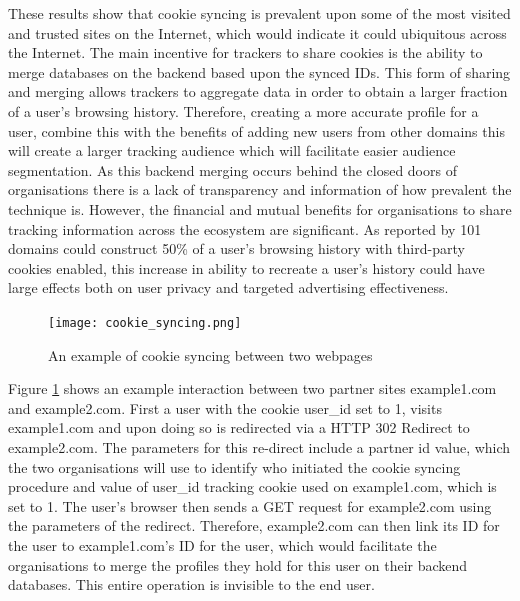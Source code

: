 \documentclass[12pt]{article}
\begin{document}
These results show that cookie syncing is prevalent upon some of the most visited and trusted sites on the Internet, which would indicate it could ubiquitous across the Internet. The main incentive for trackers to share cookies is the ability to merge databases on the backend based upon the synced IDs. This form of sharing and merging allows trackers to aggregate data in order to obtain a larger fraction of a user's browsing history. Therefore, creating a more accurate profile for a user, combine this with the benefits of adding new users from other domains this will create a larger tracking audience which will facilitate easier audience segmentation. As this backend merging occurs behind the closed doors of organisations there is a lack of transparency and information of how prevalent the technique is.  However, the financial and mutual benefits for organisations to share tracking information across the ecosystem are significant. As reported by \parencite{webNeverForgets}  101 domains could construct 50\% of a user's browsing history with third-party cookies enabled, this increase in ability to recreate a user's history could have large effects both on user privacy and targeted advertising effectiveness. \newline


\begin{figure}[H]
    \centering
    \texttt{[image: cookie\_syncing.png]}
    \caption{An example of cookie syncing between two webpages}
    \label{fig:cookie_syncing}
\end{figure}

Figure \ref{fig:cookie_syncing} shows an example interaction between two partner sites example1.com and example2.com. First a user with the cookie user\_id set to 1, visits example1.com and upon doing so is redirected via a HTTP 302 Redirect to example2.com. The parameters for this re-direct include a partner id value, which the two organisations will use to identify who initiated the cookie syncing procedure and value of user\_id tracking cookie used on example1.com, which is set to 1. The user's browser then sends a GET request for example2.com using the parameters of the redirect. Therefore, example2.com can then link its ID for the user to example1.com’s ID for the user, which would facilitate the organisations to merge the profiles they hold for this user on their backend databases. This entire operation is invisible to the end user. \\
\end{document}
